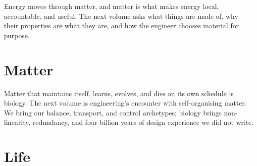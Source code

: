 \documentclass[11pt,a4paper,openright,twoside]{memoir}
\begin{document}
\begin{interlude}
Energy moves through matter, and matter is what makes energy local, accountable, and useful.
The next volume asks what things are made of, why their properties are what they are, and how the engineer chooses material for purpose.
\end{interlude}

\part{Matter}
\label{vol05}
















\begin{interlude}
Matter that maintains itself, learns, evolves, and dies on its own schedule is biology.
The next volume is engineering's encounter with self-organising matter.
We bring our balance, transport, and control archetypes; biology brings non-linearity, redundancy, and four billion years of design experience we did not write.
\end{interlude}

\part{Life}
\label{vol06}
















\end{document}

